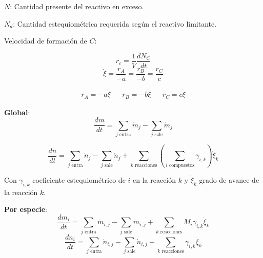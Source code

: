             \(N\): Cantidad presente del reactivo en exceso.
            
            \(N_{d}\): Cantidad estequiométrica requerida según el reactivo limitante.
            
            
            Velocidad de formación de \(C\):
            
            \[r_{c} = \frac{1}{V}\frac{dN_{C}}{dt}\]
            \begin{equation}
            \label{eq:grado_avance}
                \dot{\xi} = \frac{r_{A}}{-a} = \frac{r_{B}}{-b} = \frac{r_{C}}{c}
            \end{equation}
            
            \[
            \begin{matrix}
                r_{A} = -a \dot{\xi} & & r_{B} = -b \dot{\xi} & & r_{C} = c \dot{\xi}
            \end{matrix}
            \]
        
            
            \textbf{Global}:
            \begin{equation}
            \label{eq:bm_rxn_global_diff}
                \frac{dm}{dt} = \sum_{j \text{ entra}} \dot{m}_{j} - \sum_{j \text{ sale}} \dot{m}_{j}
            \end{equation}
            
            \begin{equation}
            \label{eq:bm_rxn_global_diff_mol}
                \frac{dn}{dt} = \sum_{j \text{ entra}} \dot{n}_{j} - \sum_{j \text{ sale}} \dot{n}_{j} + \sum_{k \text{ reacciones}} \left ( \sum_{i \text{ compuestos}} \gamma_{i,k} \right ) \dot{\xi}_{k}
            \end{equation}
            
            Con \(\gamma_{i,k}\) coeficiente estequiométrico de \(i\) en la reacción \(k\) y \(\dot{\xi}_{k}\) grado de avance de la reacción \(k\).
            
            \textbf{Por especie}:
            \begin{equation}
            \label{eq:bm_rxn_sp_diff}
                \frac{d{m}_{i}}{dt} = \sum_{j \text{ entra}} \dot{m}_{i,j} - \sum_{j \text{ sale}} \dot{m}_{i,j} + \sum_{k \text{ reacciones}} M_{i}\gamma_{i,k}\dot{\xi}_{k}
            \end{equation}
            \begin{equation}
            \label{eq:bm_rxn_sp_diff_mol}
                \frac{d{n}_{i}}{dt} = \sum_{j \text{ entra}} \dot{n}_{i,j} - \sum_{j \text{ sale}} \dot{n}_{i,j} + \sum_{k \text{ reacciones}} \gamma_{i,k} \dot{\xi}_{k}
            \end{equation}
            
